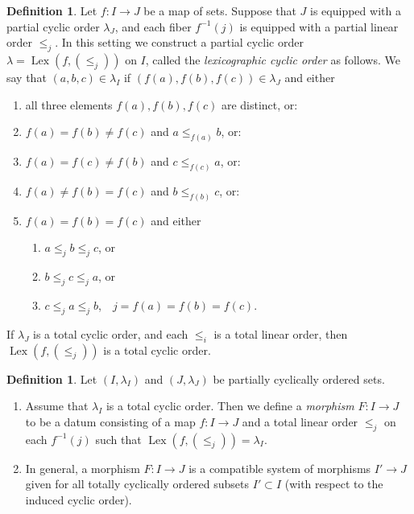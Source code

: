 \documentclass[english,11pt,leqno]{article}
\def\on{\operatorname}
\theoremstyle{definition}
\newtheorem{defi}[thm]{Definition}
\theoremstyle{remark}
\numberwithin{equation}{section}
\begin{document}
\begin{defi}  \label{defi:lexico} 
Let $f: I\to J$ be a map of sets.  Suppose that $J$ is equipped with a partial cyclic order
$\lambda_J$, and each fiber $f^{-1}(j)$ is equipped with a partial linear order $\leq_j$. In this
setting we construct a partial cyclic order $\lambda=\on{Lex}(f, (\leq_j))$ on $I$, called the {\em
lexicographic cyclic order} as follows. 
We say that $(a,b,c)\in\lambda_I$ if $(f(a), f(b), f(c))\in\lambda_J$ and either
\begin{enumerate}[labelindent=1cm]
\item[(i)]  all three elements $f(a), f(b), f(c)$  are distinct, or:

\item[(ii)]  $f(a)=f(b)\neq f(c)$ and $a\leq_{f(a)} b$,  or:

\item[(ii')] $f(a)=f(c)\neq f(b)$ and $c\leq_{f(c)}  a$, or:

\item[(ii'')] $f(a)\neq f(b)=f(c)$ and $b\leq_{f(b)} c$,  or:

\item[(iii)] $f(a)=f(b)=f(c)$ and either
\begin{enumerate}
\item $a\leq_j b\leq_j c$, or
\item $b\leq_j c\leq_j a$, or
\item $c\leq_j a\leq_j b$, \,\, $j=f(a)=f(b)=f(c)$.
\end{enumerate}
\end{enumerate}
If $\lambda_J$ is a total cyclic order, and each $\leq_i$ is a total
linear order, then $\on{Lex}(f, (\leq_j))$ is a total cyclic order. 
\end{defi}

\begin{defi}\label{def:morphisms-cyclic-orders}
 Let $(I,\lambda_I)$ and $(J, \lambda_J)$ be partially cyclically ordered sets. 
\begin{enumerate}[label=(\alph*),itemsep=0cm,topsep=1ex]
	\item Assume that $\lambda_I$ is a total cyclic order. Then we define a {\em morphism} $F: I\to J$
to be a datum consisting of a map $f: I\to J$ and a total linear order $\leq_j$ on
each $f^{-1}(j)$ such that $\on{Lex}(f, (\leq_j))=\lambda_I$.
	\item In general, a morphism $F: I\to J$ is a compatible system of
morphisms $I'\to J$ given for all totally cyclically ordered subsets $I'\subset I$  
(with respect to the induced cyclic order). 
\end{enumerate}
\end{defi}
 
\end{document}

